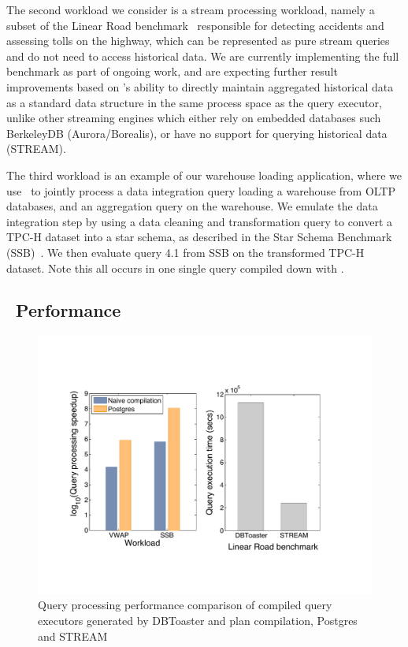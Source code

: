The second workload we consider is a stream processing workload, namely a subset
of the Linear Road benchmark~\cite{arasu-vldb:04} responsible for detecting
accidents and assessing tolls on the highway, which can be represented as pure
stream queries and do not need to access historical data. We are currently
implementing the full benchmark as part of ongoing work, and are expecting
further result improvements based on \compiler's ability to directly maintain
aggregated historical data as a standard data structure in the same process space
as the query executor, unlike other streaming engines which either rely on
embedded databases such BerkeleyDB (Aurora/Borealis), or have no support for
querying historical data (STREAM).

The third workload is an example of our warehouse loading application, where we
use \compiler\ to jointly process a data integration query loading a warehouse
from OLTP databases, and an aggregation query on the warehouse. We emulate the
data integration step by using a data cleaning and transformation query to
convert a TPC-H dataset into a star schema, as described in the Star Schema
Benchmark (SSB)~\cite{poneil-ssb:07}. We then evaluate query 4.1 from SSB on the
transformed TPC-H dataset. Note this all occurs in one single query compiled down
with \compiler.




\subsection{\compiler\ Performance}

\begin{figure}[htbp]
\begin{center}
\includegraphics[scale=0.25]{../plots/toaster_comparison}
\end{center}
\caption{Query processing performance comparison of compiled query executors
generated by DBToaster and plan compilation, Postgres and STREAM}
\label{fig:dbtperf}
\end{figure}

